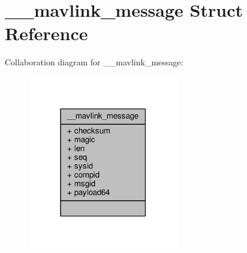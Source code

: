 \hypertarget{struct____mavlink__message}{\section{\+\_\+\+\_\+mavlink\+\_\+message Struct Reference}
\label{struct____mavlink__message}
}


Collaboration diagram for \+\_\+\+\_\+mavlink\+\_\+message\+:
\nopagebreak
\begin{figure}[H]
\begin{center}
\leavevmode
\includegraphics[width=186pt]{struct____mavlink__message__coll__graph}
\end{center}
\end{figure}
